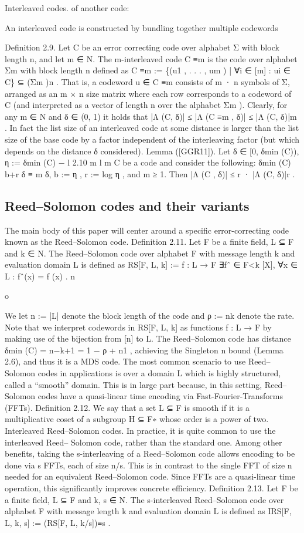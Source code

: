 \documentclass[11pt]{article}
\begin{document}
Interleaved codes.
of another code:

An interleaved code is constructed by bundling together multiple codewords

Definition 2.9. Let C be an error correcting code over alphabet Σ with block length n, and let
m ∈ N. The m-interleaved code C ≡m is the code over alphabet Σm with block length n defined as
C ≡m := \{(u1 , . . . , um ) | ∀i ∈ [m] : ui ∈ C\} ⊆ (Σm )n .
That is, a codeword u ∈ C ≡m consists of m · n symbols of Σ, arranged as an m × n size matrix where
each row corresponds to a codeword of C (and interpreted as a vector of length n over the alphabet
Σm ).
Clearly, for any m ∈ N and δ ∈ (0, 1) it holds that |Λ (C, δ)| ≤ |Λ (C ≡m , δ)| ≤ |Λ (C, δ)|m . In fact
the list size of an interleaved code at some distance is larger than the list size of the base code by
a factor independent of the interleaving factor (but which depends on the distance δ considered).
Lemma
([GGR11]).
Let
δ ∈ [0, δmin (C)), η := δmin (C) −
l 2.10
m
l
m C be a code and consider the following:
δmin (C)
b+r
δ
≡
m
δ, b := η , r := log η
, and m ≥ 1. Then |Λ (C , δ)| ≤ r · |Λ (C, δ)|r .


\subsection{Reed–Solomon codes and their variants}



The main body of this paper will center around a specific error-correcting code known as the
Reed–Solomon code.
Definition 2.11. Let F be a finite field, L ⊆ F and k ∈ N. The Reed–Solomon code over
alphabet F with message length k and evaluation domain L is defined as
RS[F, L, k] := f : L → F ∃fˆ ∈ F<k [X], ∀x ∈ L : fˆ(x) = f (x) .
n

o

We let n := |L| denote the block length of the code and ρ := nk denote the rate.
Note that we interpret codewords in RS[F, L, k] as functions f : L → F by making use of the
bijection from [n] to L.
The Reed–Solomon code has distance δmin (C) = n−k+1
= 1 − ρ + n1 , achieving the Singleton
n
bound (Lemma 2.6), and thus it is a MDS code.
The most common scenario to use Reed–Solomon codes in applications is over a domain L
which is highly structured, called a “smooth” domain. This is in large part because, in this setting,
Reed–Solomon codes have a quasi-linear time encoding via Fast-Fourier-Transforms (FFTs).
Definition 2.12. We say that a set L ⊆ F is smooth if it is a multiplicative coset of a subgroup
H ⊆ F∗ whose order is a power of two.
Interleaved Reed–Solomon codes. In practice, it is quite common to use the interleaved Reed–
Solomon code, rather than the standard one. Among other benefits, taking the s-interleaving of a
Reed–Solomon code allows encoding to be done via s FFTs, each of size n/s. This is in contrast to
the single FFT of size n needed for an equivalent Reed–Solomon code. Since FFTs are a quasi-linear
time operation, this significantly improves concrete efficiency.
Definition 2.13. Let F be a finite field, L ⊆ F and k, s ∈ N. The s-interleaved Reed–Solomon
code over alphabet F with message length k and evaluation domain L is defined as
IRS[F, L, k, s] := (RS[F, L, k/s])≡s .
\end{document}
